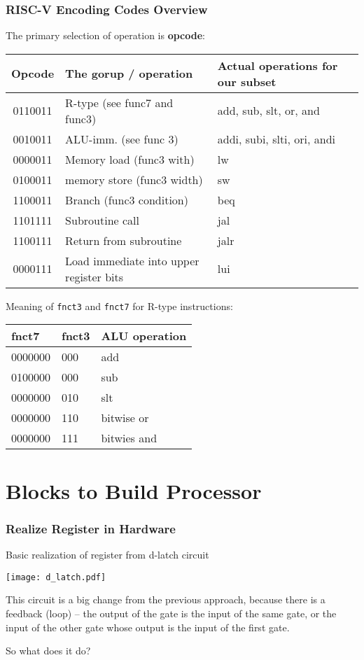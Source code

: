 \documentclass{beamer}
\begin{document}
\begin{frame}
\frametitle{RISC-V Encoding Codes Overview}

The primary selection of operation is \textbf{opcode}:
\begin{table}
\footnotesize
\begin{tabular}{|c|l|l|}\hline
Opcode & The gorup / operation & Actual operations for our subset \\ \hline
0110011 & R-type (see func7 and func3) & add, sub, slt, or, and \\ \hline
0010011 & ALU-imm. (see func 3) & addi, subi, slti, ori, andi \\ \hline
0000011 & Memory load (func3 with) & lw \\ \hline
0100011 & memory store (func3 width) & sw \\ \hline
1100011 & Branch (func3 condition) & beq \\ \hline
1101111 & Subroutine call & jal \\ \hline
1100111 & Return from subroutine & jalr \\ \hline
0000111 & Load immediate into upper register bits & lui \\ \hline
\end{tabular}
\end{table}

Meaning of \texttt{fnct3} and \texttt{fnct7} for R-type instructions:
\begin{table}
\footnotesize
\begin{tabular}{|l|l|l|}\hline
fnct7 & fnct3 & ALU operation \\ \hline
0000000 & 000  & add \\ \hline
0100000 & 000  & sub \\ \hline
0000000 & 010  & slt \\ \hline
0000000 & 110  & bitwise or \\ \hline
0000000 & 111  & bitwies and \\ \hline
\end{tabular}
\end{table}

\end{frame}

\section{Blocks to Build Processor}

\begin{frame}
\frametitle{Realize Register in Hardware}
Basic realization of register from d-latch circuit
\begin{center}
\texttt{[image: d\_latch.pdf]}
\end{center}

This circuit is a big change from the previous approach, because there is a feedback (loop) -- the output of the gate is the input of the same gate, or the input of the other gate whose output is the input of the first gate.

So what does it do?

\end{frame}
\end{document}
